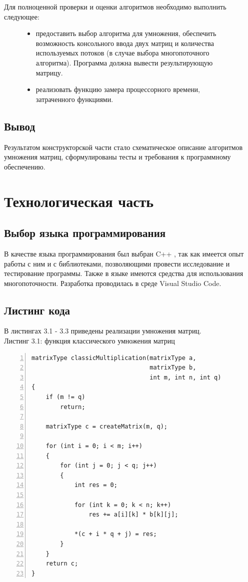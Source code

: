 \documentclass[12pt,a4paper]{report}
\begin{document}
Для полноценной проверки и оценки алгоритмов необходимо выполнить следующее:
\begin{figure}[h!]
    \begin{itemize}
        \item предоставить выбор алгоритма для умножения, обеспечить возможность консольного ввода двух 
        матриц и количества используемых потоков (в случае выбора многопоточного алгоритма). Программа 
        должна вывести результирующую матрицу.
        \item реализовать функцию замера процессорного времени, затраченного функциями.
    \end{itemize}
\end{figure}

\newpage
\section{Вывод}

Результатом конструкторской части стало схематическое описание алгоритмов умножения матриц, 
сформулированы тесты и требования к программному обеспечению.

\newpage
\chapter{Технологическая часть} 

\section{Выбор языка программирования}

В качестве языка программирования был выбран C++ \cite{cpp_info}, так как имеется опыт работы с ним и с 
библиотеками, позволяющими провести исследование и тестирование программы. 
Также в языке имеются средства для использования многопоточности. 
Разработка проводилась в среде Visual Studio Code.

\section{Листинг кода}

В листингах 3.1 - 3.3 приведены реализации умножения матриц. \\

\textrm{Листинг 3.1: функция классического умножения матриц}
\begin{lstlisting}[frame=single, numbers=left]
matrixType classicMultiplication(matrixType a, 
                                 matrixType b, 
                                 int m, int n, int q)
{
    if (m != q)
        return;

    matrixType c = createMatrix(m, q);
    
    for (int i = 0; i < m; i++)
    {
        for (int j = 0; j < q; j++)
        {
            int res = 0;
    
            for (int k = 0; k < n; k++)
                res += a[i][k] * b[k][j];
    
            *(c + i * q + j) = res;
        }
    }
    return c;
}
\end{lstlisting}
\end{document}
